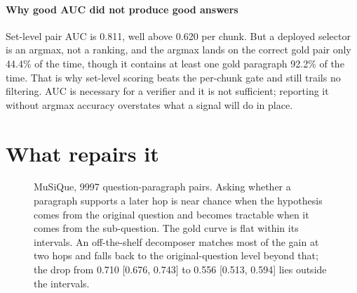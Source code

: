 \documentclass[conference]{IEEEtran}
\begin{document}
\paragraph{Why good AUC did not produce good answers}
Set-level pair AUC is 0.811, well above 0.620 per chunk. But a deployed selector
is an argmax, not a ranking, and the argmax lands on the correct gold pair only
44.4\% of the time, though it contains at least one gold paragraph 92.2\% of the
time. That is why set-level scoring beats the per-chunk gate and still trails no
filtering. AUC is necessary for a verifier and it is not sufficient; reporting it
without argmax accuracy overstates what a signal will do in place.

\section{What repairs it}
\label{sec:decomp}

\begin{figure}[t]
\centering
{}
\caption{MuSiQue, 9997 question-paragraph pairs. Asking whether a paragraph
supports a later hop is near chance when the hypothesis comes from the original
question and becomes tractable when it comes from the sub-question. The gold
curve is flat within its intervals. An off-the-shelf decomposer matches most of
the gain at two hops and falls back to the original-question level beyond that;
the drop from 0.710 [0.676, 0.743] to 0.556 [0.513, 0.594] lies outside the
intervals.}
\label{fig:decomp}
\end{figure}
\end{document}
